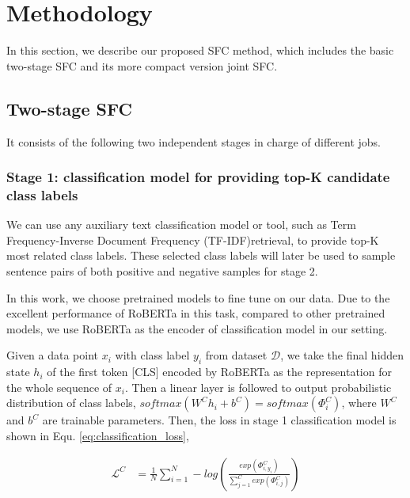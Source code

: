 \section{Methodology}
In  this section, we describe our proposed SFC method, which includes the basic two-stage SFC and its more compact version joint SFC.

\subsection{Two-stage SFC}

It consists of the following  two  independent stages  in  charge of different  jobs. 

\subsubsection*{
  Stage 1: classification model for providing top-K candidate class labels
} 
We  can  use any auxiliary text classification model or tool,
such as Term Frequency-Inverse Document Frequency (TF-IDF)retrieval, to
provide  top-K  most  related  class  labels. These selected class labels will
later  be  used to sample sentence pairs of both positive and negative
samples  for  stage  2. 

In  this  work,  we  choose pretrained models to fine tune on our data.
Due to the excellent performance of RoBERTa in this task, compared to other pretrained
models, we use RoBERTa as the encoder of classification model in our setting.

Given   a   data   point   $x_{i}$  with  class  label  $y_{i}$  from  dataset
$\mathcal{D}$, we take the final hidden state $h_{i}$ of the first token [CLS]
encoded  by  RoBERTa  as the representation for the whole sequence of $x_{i}$.
Then  a linear layer is followed to output probabilistic distribution of class
labels,  $softmax(W^Ch_{i}+b^C)=softmax({\Phi}^C_{i})$,  where $W^C$ and $b^C$
are  trainable  parameters.  Then, the loss in stage 1 classification model is
shown in Equ. \ref{eq:classification_loss},


\begin{equation}
  \begin{aligned}
    \mathcal{L}^{C}&=\frac{1}{N}\sum_{i=1}^{N}-log(\frac{exp(\varPhi_{i,y_{i}}^C)}{\sum_{j=1}^{C}exp(\varPhi_{i,j}^C)}) \\
    \label{eq:classification_loss}
  \end{aligned}
\end{equation}


